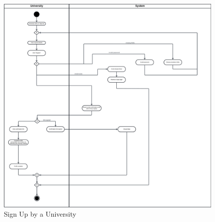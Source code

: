 \begin{figure}[H]
    \begin{center}
         \includegraphics[width=1\linewidth]{LaTeXCode/images/activity diagram/UC3.png}
         \caption{Sign Up by a University}
         \label{fig:signup_university_ad}
     \end{center}
\end{figure}

\newpage

